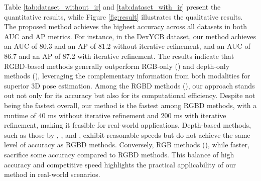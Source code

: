 Table \ref{tab:dataset_without_ir} and \ref{tab:dataset_with_ir} present the quantitative results, while Figure \ref{fig:result} illustrates the qualitative results. The proposed method achieves the highest accuracy across all datasets in both AUC and AP metrics. For instance, in the DexYCB dataset, our method achieves an AUC of 80.3 and an AP of 81.2 without iterative refinement, and an AUC of 86.7 and an AP of 87.2 with iterative refinement. The results indicate that RGBD-based methods generally outperform RGB-only (\cite{billings2019silhonet, peng2019pvnet, wang2021gdr, castro2023crt}) and depth-only methods (\cite{wang20216d, gao20206d, guo2021efficient}), leveraging the complementary information from both modalities for superior 3D pose estimation. Among the RGBD methods (\cite{wang2019densefusion, he2020pvn3d, he2021ffb6d, wu2023geometric, hong2024rdpn6d, lin2024hipose}), our approach stands out not only for its accuracy but also for its computational efficiency. Despite not being the fastest overall, our method is the fastest among RGBD methods, with a runtime of 40 ms without iterative refinement and 200 ms with iterative refinement, making it feasible for real-world applications. Depth-based methods, such as those by \cite{wang20216d}, \cite{gao20206d}, and \cite{guo2021efficient}, exhibit reasonable speeds but do not achieve the same level of accuracy as RGBD methods. Conversely, RGB methods (\cite{billings2019silhonet, peng2019pvnet, wang2021gdr, castro2023crt}), while faster, sacrifice some accuracy compared to RGBD methods. This balance of high accuracy and competitive speed highlights the practical applicability of our method in real-world scenarios.

